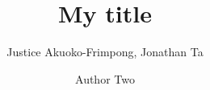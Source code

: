 



\addtolength{\oddsidemargin}{-.5in}%
\addtolength{\evensidemargin}{-1in}%
\addtolength{\textwidth}{1in}%
\addtolength{\textheight}{1.7in}%
\addtolength{\topmargin}{-1in}%



\def\spacingset#1{\renewcommand{\baselinestretch}%
{#1}\small\normalsize} \spacingset{1}

\date{}

\newcommand{\footremember}[2]{%
    \footnote{#2}
    \newcounter{#1}
    \setcounter{#1}{\value{footnote}}%
}
\newcommand{\footrecall}[1]{%
    \footnotemark[\value{#1}]%
} 

\newcommand{\bbR}{\mathbb{R}}
\newcommand{\bX}{\boldsymbol{X}}
\newcommand{\bs}{\boldsymbol{s}}
\newcommand{\Ytilde}{\tilde{Y}}

\newcommand{\mytitle}{My title}  

\title{\bf \mytitle}
\author{Justice Akuoko-Frimpong, Jonathan Ta \and Author Two }

\maketitle


\spacingset{1.9} %


